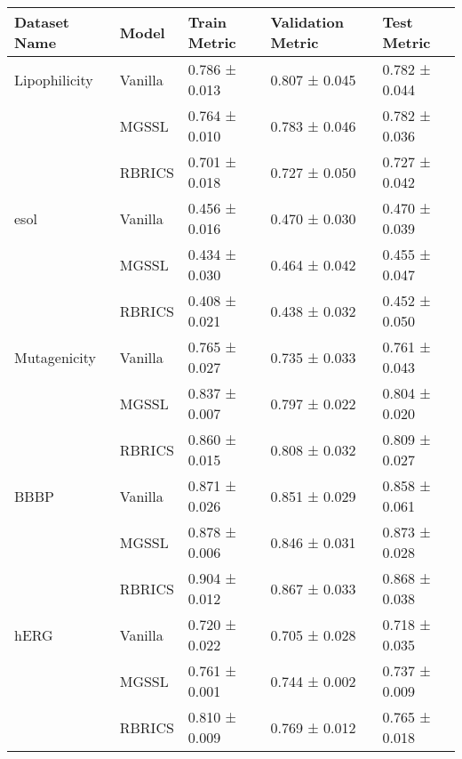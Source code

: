 \begin{tabular}{|l|l|l|l|l|}
\toprule
Dataset Name & Model & Train Metric & Validation Metric & Test Metric \\
\midrule
Lipophilicity & Vanilla & 0.786 ± 0.013 & 0.807 ± 0.045 & 0.782 ± 0.044 \\
 & MGSSL & 0.764 ± 0.010 & 0.783 ± 0.046 & 0.782 ± 0.036 \\
 & RBRICS & 0.701 ± 0.018 & 0.727 ± 0.050 & 0.727 ± 0.042 \\
esol & Vanilla & 0.456 ± 0.016 & 0.470 ± 0.030 & 0.470 ± 0.039 \\
 & MGSSL & 0.434 ± 0.030 & 0.464 ± 0.042 & 0.455 ± 0.047 \\
 & RBRICS & 0.408 ± 0.021 & 0.438 ± 0.032 & 0.452 ± 0.050 \\
Mutagenicity & Vanilla & 0.765 ± 0.027 & 0.735 ± 0.033 & 0.761 ± 0.043 \\
 & MGSSL & 0.837 ± 0.007 & 0.797 ± 0.022 & 0.804 ± 0.020 \\
 & RBRICS & 0.860 ± 0.015 & 0.808 ± 0.032 & 0.809 ± 0.027 \\
BBBP & Vanilla & 0.871 ± 0.026 & 0.851 ± 0.029 & 0.858 ± 0.061 \\
 & MGSSL & 0.878 ± 0.006 & 0.846 ± 0.031 & 0.873 ± 0.028 \\
 & RBRICS & 0.904 ± 0.012 & 0.867 ± 0.033 & 0.868 ± 0.038 \\
hERG & Vanilla & 0.720 ± 0.022 & 0.705 ± 0.028 & 0.718 ± 0.035 \\
 & MGSSL & 0.761 ± 0.001 & 0.744 ± 0.002 & 0.737 ± 0.009 \\
 & RBRICS & 0.810 ± 0.009 & 0.769 ± 0.012 & 0.765 ± 0.018 \\
\bottomrule
\end{tabular}
